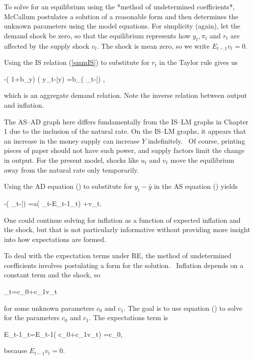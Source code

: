 ﻿\documentclass[oneside]{book}
\begin{document}
To solve for an equilibrium using the *method of undetermined coefficients*, McCallum  postulates a solution of a reasonable form and
then determines the unknown parameters using the model equations. For simplicity (again), let the demand shock be zero, so that the equilibrium represents how $y_{t}, \pi _{t}$ and $r_{t}$ are affected by the supply
shock $v_{t}$. The shock is mean zero, so we write $E_{t-1}v_{t}=0$.

Using the IS relation (\ref{smmIS}) to substitute for $r_{t}$ in the Taylor rule gives us



-( 1+b_{y}) ( y_{t}-\bar{y}) =b_{\pi }( \pi _{t}-\bar{\pi}) ,


which is an aggregate demand relation. Note the inverse relation between output and inflation.

The AS--AD graph here differs fundamentally from the IS--LM graphs in Chapter 1 due to the inclusion of the natural rate. On the IS--LM graphs, it appears that an increase in the money supply can increase $Y$ indefinitely. \
Of course, printing pieces of paper should not have such power, and supply factors limit the change in output. For the present model, shocks like $u_{t}$ and $v_{t}$ move the equilibrium away from the natural rate only temporarily.

Using the AD equation () to substitute for $y_{t}-\bar{y}$ in the AS equation () yields



-( \pi _{t}-\bar{\pi}) =a( \pi
_{t}-E_{t-1}\pi _{t}) +v_{t}.


One could continue solving for inflation as a function of expected inflation and the shock, but that is not particularly informative without providing more insight into how expectations are formed.

To deal with the expectation terms under RE, the method
of undetermined coefficients involves postulating a form for the solution. \
Inflation depends on a constant term and the shock, so



\pi _{t}=c_{0}+c_{1}v_{t}


for some unknown parameters $c_{0}$ and $c_{1}$. The goal is to use equation () to solve for the parameters $c_{0}$ and $c_{1}$. The expectations term is



E_{t-1}\pi _{t}=E_{t-1}( c_{0}+c_{1}v_{t}) =c_{0},


because $E_{t-1}v_{t}=0$.
\end{document}
